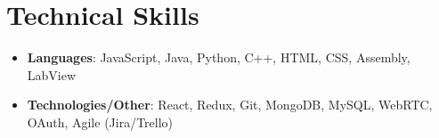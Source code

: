 \documentclass[letterpaper,11pt]{article}
\newcommand{\resumeSubHeadingListStart}{\begin{itemize}[leftmargin=*]}
\newcommand{\resumeSubHeadingListEnd}{\end{itemize}}
\begin{document}
%
\section{Technical Skills}
 \resumeSubHeadingListStart
   \item{
     \textbf{Languages}{: JavaScript, Java, Python, C++, HTML, CSS, Assembly, LabView}
   }
   \item{
     \textbf{Technologies/Other}{: React, Redux, Git, MongoDB, MySQL, WebRTC, OAuth, Agile (Jira/Trello)}
   }
 \resumeSubHeadingListEnd


\end{document}
